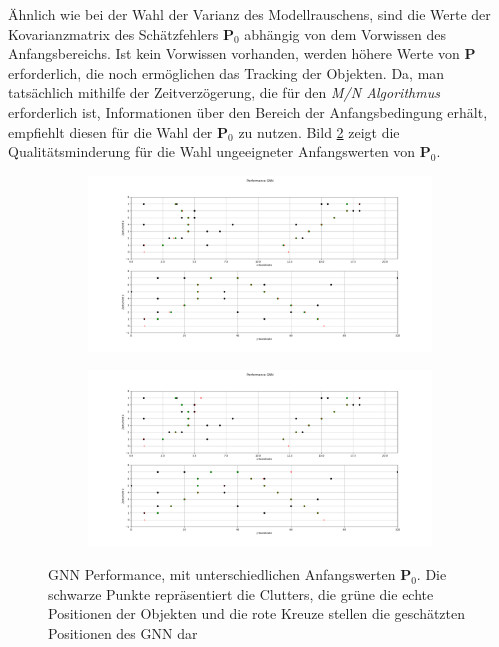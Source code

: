 \documentclass[10pt,a4paper]{article}
\begin{document}
Ähnlich wie bei der Wahl der Varianz des Modellrauschens, sind die Werte der Kovarianzmatrix des Schätzfehlers $\textbf{P}_0$ abhängig von dem Vorwissen des Anfangsbereichs. Ist kein Vorwissen vorhanden, werden höhere Werte von $\textbf{P}$ erforderlich, die noch ermöglichen das Tracking der Objekten. Da, man tatsächlich mithilfe der Zeitverzögerung, die für den \textit{M/N Algorithmus} erforderlich ist, Informationen über den Bereich der Anfangsbedingung erhält, empfiehlt \cite{IDS} diesen für die Wahl der $\textbf{P}_0$ zu nutzen. Bild \ref{pic:GNNP} zeigt die Qualitätsminderung für die Wahl ungeeigneter Anfangswerten von $\textbf{P}_0$.\\
\begin{figure}[h!]
    \centering
    \begin{subfigure}{0.6\textwidth}
        \includegraphics[width=11cm]{./Pictures_report/GNNP0.png}
    \end{subfigure}

\medskip
    \begin{subfigure}{0.6\textwidth}
        \includegraphics[width= 11cm]{./Pictures_report/GNNP1.png}
        \label{fig:arm4}
    \end{subfigure}
    \caption[]{GNN Performance, mit unterschiedlichen Anfangswerten $\textbf{P}_0$. Die schwarze Punkte repräsentiert die Clutters, die grüne die echte Positionen der Objekten und die rote Kreuze stellen die geschätzten Positionen des GNN dar  }
    \label{pic:GNNP}
\end{figure}
\end{document}
